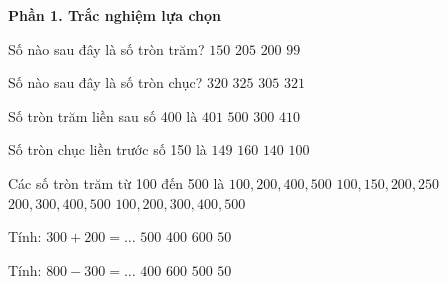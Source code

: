 \textbf{Phần 1. Trắc nghiệm lựa chọn}

\begin{ex} %
Số nào sau đây là số tròn trăm?
\choice
{$150$}
{$205$}
{\True $200$}
{$99$}
\end{ex}

\begin{ex} %
Số nào sau đây là số tròn chục?
\choice
{\True $320$}
{$325$}
{$305$}
{$321$}
\end{ex}

\begin{ex} %
Số tròn trăm liền sau số 400 là
\choice
{$401$}
{\True $500$}
{$300$}
{$410$}
\end{ex}

\begin{ex} %
Số tròn chục liền trước số 150 là
\choice
{$149$}
{$160$}
{\True $140$}
{$100$}
\end{ex}

\begin{ex} %
Các số tròn trăm từ 100 đến 500 là
\choice
{$100, 200, 400, 500$}
{$100, 150, 200, 250$}
{$200, 300, 400, 500$}
{\True $100, 200, 300, 400, 500$}
\end{ex}

\begin{ex} %
Tính: $300 + 200 = \dots$
\choice
{\True $500$}
{$400$}
{$600$}
{$50$}
\end{ex}

\begin{ex} %
Tính: $800 - 300 = \dots$
\choice
{$400$}
{$600$}
{\True $500$}
{$50$}
\end{ex}


